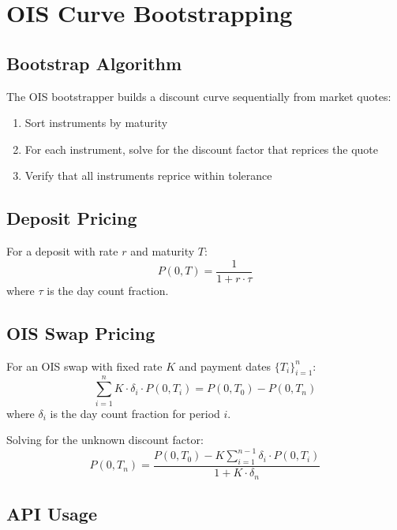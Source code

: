 \documentclass[12pt,a4paper]{report}
\begin{document}
\section{OIS Curve Bootstrapping}

\subsection{Bootstrap Algorithm}

The OIS bootstrapper builds a discount curve sequentially from market quotes:

\begin{enumerate}
    \item Sort instruments by maturity
    \item For each instrument, solve for the discount factor that reprices the quote
    \item Verify that all instruments reprice within tolerance
\end{enumerate}

\subsection{Deposit Pricing}

For a deposit with rate $r$ and maturity $T$:
\begin{equation}
    P(0,T) = \frac{1}{1 + r \cdot \tau}
\end{equation}
where $\tau$ is the day count fraction.

\subsection{OIS Swap Pricing}

For an OIS swap with fixed rate $K$ and payment dates $\{T_i\}_{i=1}^n$:
\begin{equation}
    \sum_{i=1}^{n} K \cdot \delta_i \cdot P(0,T_i) = P(0,T_0) - P(0,T_n)
\end{equation}
where $\delta_i$ is the day count fraction for period $i$.

Solving for the unknown discount factor:
\begin{equation}
    P(0,T_n) = \frac{P(0,T_0) - K \sum_{i=1}^{n-1} \delta_i \cdot P(0,T_i)}{1 + K \cdot \delta_n}
\end{equation}

\subsection{API Usage}
\end{document}
